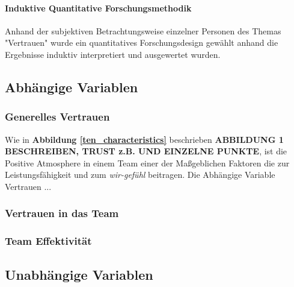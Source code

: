 \documentclass[a4paper,11pt]{article}%
\renewcommand{\\}{\vspace*{0.5\baselineskip} \newline}
\begin{document}
{				\paragraph{Induktive Quantitative Forschungsmethodik}
				Anhand der subjektiven Betrachtungsweise einzelner Personen des Themas "Vertrauen" wurde ein quantitatives Forschungsdesign gewählt anhand die Ergebnisse induktiv interpretiert und ausgewertet wurden.
		\subsection{Abhängige Variablen}
			\subsubsection{Generelles Vertrauen}
			Wie in \textbf{Abbildung \ref{ten_characteristics}} beschrieben \textbf{ABBILDUNG 1 BESCHREIBEN, TRUST z.B. UND EINZELNE PUNKTE}, ist die Positive Atmosphere in einem Team einer der Maßgeblichen Faktoren die zur Leistungsfähigkeit und zum \textit{\glqq wir-gefühl\grqq} beitragen.
			Die Abhängige Variable Vertrauen ...	
			\subsubsection{Vertrauen in das Team}
			\subsubsection{Team Effektivität}
		\subsection{Unabhängige Variablen}
}
\end{document}
